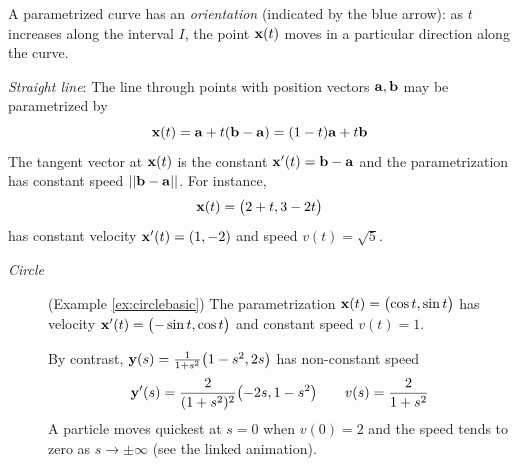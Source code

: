 A parametrized curve has an \emph{orientation} (indicated by the blue arrow): as $t$ increases along the interval $I$, the point ${\mathbf{x}}(t)$ moves in a particular direction along the curve.


\begin{minipage}[t]{0.69\linewidth}\vspace{0pt}
	\begin{examples}{}{}
		\hangindent\leftmargini
		\emph{Straight line}: The line through points with position vectors ${\mathbf{a}},{\mathbf{b}}$ may be parametrized by
		\[
			{\mathbf{x}}(t)={\mathbf{a}}+t({\mathbf{b}}-{\mathbf{a}})=(1-t){\mathbf{a}}+t{\mathbf{b}}
		\]
		The tangent vector at ${\mathbf{x}}(t)$ is the constant ${\mathbf{x}}'(t)={\mathbf{b}}-{\mathbf{a}}$ and the parametrization has constant speed $\left| \left| {\mathbf{b}}-{\mathbf{a}}\right|\right|$. For instance,
		\[
			{\mathbf{x}}(t)=\bigl(2+t,3-2t\bigr)
		\]
		has constant velocity ${\mathbf{x}}'(t)=(1,-2)$ and speed $v(t)=\sqrt 5$.
		\begin{description}
		  \item[\normalfont\emph{Circle}] (Example \ref{ex:circlebasic}) The parametrization ${\mathbf{x}}(t)=\bigl(\cos t,\sin t\bigr)$ has velocity ${\mathbf{x}}'(t)=\bigl(-\sin t,\cos t\bigr)$ and constant speed $v(t)=1$.\par
		  By contrast, ${\mathbf{y}}(s)=\tfrac 1{1+s^2}\bigl(1-s^2,2s\bigr)$ has non-constant speed
		  \[
		  	{\mathbf{y}}'(s)=\frac 2{(1+s^2)^2}\bigl(-2s,1-s^2\bigr)\qquad v(s)=\frac 2{1+s^2}
		  \]
		  A particle moves quickest at $s=0$ when $v(0)=2$ and the speed tends to zero as $s\to\pm\infty$ (see the linked animation).
		\end{description}
	\end{examples}
\end{minipage}
\hfill
